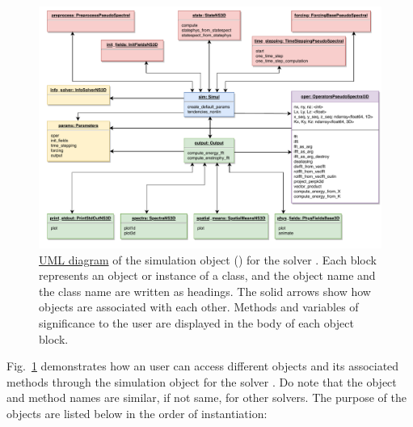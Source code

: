 \documentclass{../jors}
\begin{document}
%


\begin{figure}[htp]
\centering
\includegraphics[width=\linewidth]{Fig/fig_simul_obj}
\caption{%
\href{https://www.uml-diagrams.org}{UML diagram} of the simulation
object () for the solver
.
%
Each block represents an object or instance of a class, and the object name
and the class name are written as headings. The solid arrows show how objects are
associated with each other.
%
Methods and variables of significance to the user are displayed in the body of
each object block.}
\label{fig:simul}
\end{figure}

Fig.~\ref{fig:simul} demonstrates how an user can access different objects and
its associated methods through the simulation object for the solver
. Do note that the object and method names
are similar, if not same, for other solvers. The purpose of the objects are
listed below in the order of instantiation:
\end{document}
